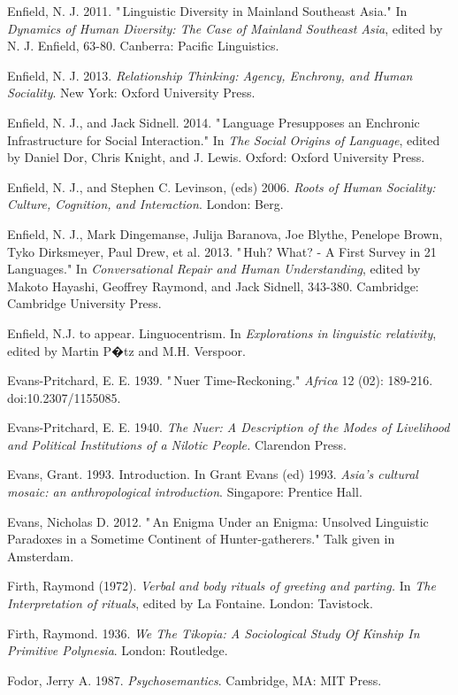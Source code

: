 Enfield, N. J. 2011. "\,Linguistic Diversity in Mainland Southeast 
Asia." In \textit{Dynamics of Human Diversity: The Case of Mainland 
Southeast Asia}, edited by N. J. Enfield, 63-80. Canberra: Pacific 
Linguistics.

Enfield, N. J. 2013. \textit{Relationship Thinking: Agency, Enchrony, 
and Human Sociality}. New York: Oxford University Press.

Enfield, N. J., and Jack Sidnell. 2014. "\,Language Presupposes an 
Enchronic Infrastructure for Social Interaction." In \textit{The Social 
Origins of Language}, edited by Daniel Dor, Chris Knight, and J. 
Lewis. Oxford: Oxford University Press.

Enfield, N. J., and Stephen C. Levinson, (eds) 2006.\textit{ Roots of 
Human Sociality: Culture, Cognition, and Interaction}. London: Berg.

Enfield, N. J., Mark Dingemanse, Julija Baranova, Joe Blythe, Penelope 
Brown, Tyko Dirksmeyer, Paul Drew, et al. 2013. "\,Huh? What? - A First 
Survey in 21 Languages." In \textit{Conversational Repair and Human 
Understanding}, edited by Makoto Hayashi, Geoffrey Raymond, and Jack 
Sidnell, 343-380. Cambridge: Cambridge University Press.

Enfield, N.J. to appear. Linguocentrism. In \textit{Explorations in 
linguistic relativity}, edited by Martin P�tz and M.H. Verspoor.

Evans-Pritchard, E. E. 1939. "\,Nuer Time-Reckoning." \textit{Africa} 
12 (02): 189-216. doi:10.2307/1155085.

Evans-Pritchard, E. E. 1940. \textit{The Nuer: A Description of the 
Modes of Livelihood and Political Institutions of a Nilotic People.} 
Clarendon Press.

Evans, Grant. 1993. Introduction. In Grant Evans (ed) 1993. \textit{
Asia's cultural mosaic: an anthropological introduction}. Singapore: 
Prentice Hall.

Evans, Nicholas D. 2012. "\,An Enigma Under an Enigma: Unsolved 
Linguistic Paradoxes in a Sometime Continent of Hunter-gatherers." Talk 
given in Amsterdam.

Firth, Raymond (1972). \textit{Verbal and body rituals of greeting and 
parting.} In \textit{The Interpretation of rituals}, edited by La 
Fontaine. London: Tavistock.

Firth, Raymond. 1936. \textit{We The Tikopia: A Sociological Study Of 
Kinship In Primitive Polynesia}. London: Routledge.

Fodor, Jerry A. 1987. \textit{Psychosemantics}. Cambridge, MA: MIT 
Press.

